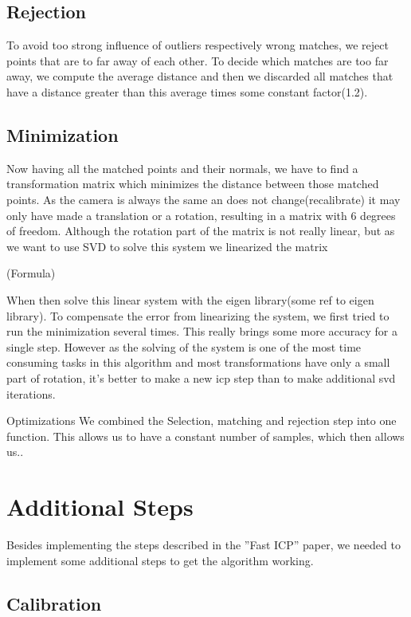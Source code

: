 \documentclass[10pt,twocolumn,letterpaper]{article}
\begin{document}
\subsection{Rejection}
To avoid too strong influence of outliers respectively wrong matches, we reject points that are to far away of each other. 
To decide which matches are too far away, we compute the average distance and then we discarded all matches that have a distance greater than this average times some constant factor(1.2).

\subsection{Minimization}
\label{minimization}
Now having all the matched points and their normals, we have to find a transformation matrix which minimizes the distance between those matched points.
As the camera is always the same an does not change(recalibrate) it may only have made a translation or a rotation, resulting in a matrix with 6 degrees of freedom.
Although the rotation part of the matrix is not really linear, but as we want to use SVD to solve this system we linearized the matrix

(Formula)

\cite{ptp}

When then solve this linear system with the eigen library(some ref to eigen library).
To compensate the error from linearizing the system, we first tried to run the minimization several times. 
This really brings some more accuracy for a single step. 
However as the solving of the system is one of the most time consuming tasks in this algorithm and most transformations have only a small part of rotation, it's better to make a new icp step than to make additional svd iterations.

Optimizations
We combined the Selection, matching and rejection step into one function. This allows us to have a constant number of samples, which then allows us..

\section{Additional Steps}
Besides implementing the steps described in the ''Fast ICP''\cite{fasticp} paper, we needed to implement some additional steps to get the algorithm working.

\subsection{Calibration}
\end{document}
